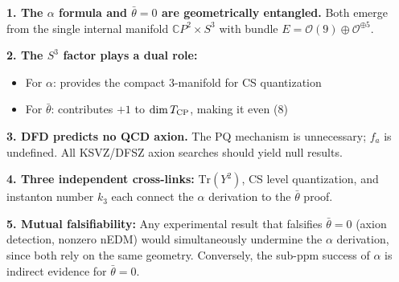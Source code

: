 \documentclass[11pt]{article}
\theoremstyle{remark}
\begin{document}
\begin{tcolorbox}[colback=blue!5!white, colframe=blue!50!black,
  title=Summary of Findings]

\textbf{1. The $\alpha$ formula and $\bar\theta = 0$ are geometrically entangled.}
Both emerge from the single internal manifold $\mathbb{C}P^2 \times S^3$ with
bundle $E = \mathcal{O}(9) \oplus \mathcal{O}^{\oplus 5}$.

\textbf{2. The $S^3$ factor plays a dual role:}
\begin{itemize}
\item For $\alpha$: provides the compact 3-manifold for CS quantization
\item For $\bar\theta$: contributes $+1$ to $\dim T_{\rm CP}$, making it even (8)
\end{itemize}

\textbf{3. DFD predicts no QCD axion.}
The PQ mechanism is unnecessary; $f_a$ is undefined.  All KSVZ/DFSZ axion
searches should yield null results.

\textbf{4. Three independent cross-links:}
$\mathrm{Tr}(Y^2)$, CS level quantization, and instanton number $k_3$
each connect the $\alpha$ derivation to the $\bar\theta$ proof.

\textbf{5. Mutual falsifiability:}
Any experimental result that falsifies $\bar\theta = 0$ (axion detection,
nonzero nEDM) would simultaneously undermine the $\alpha$ derivation, since
both rely on the same geometry.  Conversely, the sub-ppm success of $\alpha$
is indirect evidence for $\bar\theta = 0$.
\end{tcolorbox}
\end{document}
